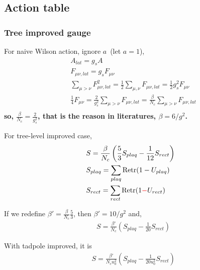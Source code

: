 \subsection{\label{actiontable}Action table}

\subsubsection{\label{TreeImprovedGauge}Tree improved gauge}

For naive Wilson action, ignore $a$~(let $a=1$),
\begin{equation}
\begin{split}
&A_{lat} = g_s A\\    
&F_{\mu\nu,lat} = g_sF_{\mu\nu}\\    
&\sum _{\mu>\nu}F^2_{\mu\nu,lat} = \frac{1}{2}\sum _{\mu ,\nu}F_{\mu\nu,lat} = \frac{1}{2}g_s^2 F_{\mu\nu}\\    
&\frac{1}{4}F_{\mu\nu} = \frac{2}{g_s^2} \sum _{\mu>\nu}F_{\mu\nu,lat}=\frac{\beta}{N_c}\sum _{\mu>\nu}F_{\mu\nu,lat}\\
\end{split}
\end{equation}
\textbf{so, $\frac{\beta}{N_c}=\frac{2}{g_s^2}$, that is the reason in literatures, $\beta = 6/g^2$.}

For tree-level improved case, 
\begin{equation}
\begin{split}
&S=\frac{\beta}{N_c}\left(\frac{5}{3} S_{plaq}- \frac{1}{12} S_{rect}\right)\\
&S_{plaq} = \sum _{plaq}{\rm Retr}(1-U_{plaq})\\
&S_{rect} = \sum _{rect}{\rm Retr}(1\textcolor[rgb]{1,0,0}{-}U_{rect})\\
\end{split}
\end{equation}

If we redefine $\beta' = \frac{\beta}{N_c}\frac{5}{3}$, then $\beta' = 10/g^2$ and,
\begin{equation}
\begin{split}
&S=\frac{\beta'}{N_c}\left(S_{plaq}- \frac{1}{20} S_{rect}\right)
\end{split}
\end{equation}

With tadpole improved, it is
\begin{equation}
\begin{split}
&S=\frac{\beta'}{N_cu_0^2}\left(S_{plaq}- \frac{1}{20u_0^2} S_{rect}\right)
\end{split}
\end{equation}

